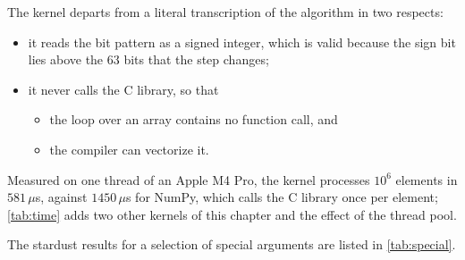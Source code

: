 The kernel departs from a literal transcription of the algorithm in two respects:
\begin{itemize}
\item it reads the bit pattern as a signed integer, which is valid because the sign bit lies above the $63$ bits that the step changes;
\item it never calls the C library, so that
  \begin{itemize}
  \item the loop over an array contains no function call, and
  \item the compiler can vectorize it.
  \end{itemize}
\end{itemize}
Measured on one thread of an Apple M4 Pro, the kernel processes $10^6$ elements in $581\,\mu$s, against $1450\,\mu$s for NumPy, which calls the C library once per element; \cref{tab:time} adds two other kernels of this chapter and the effect of the thread pool.

\begin{table}
\end{table} The stardust results for a selection of special arguments are listed in \cref{tab:special}.

\begin{table}
\end{table}

